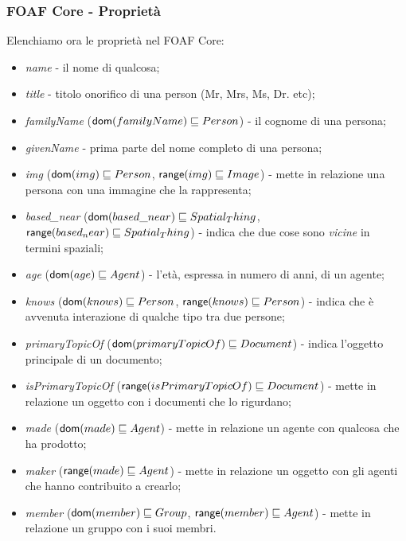 \documentclass[8pt]{beamer}
\begin{document}
\begin{frame}
  \frametitle{FOAF Core - Propriet\`a}
  Elenchiamo ora le propriet\`a nel FOAF Core:
  
  \begin{itemize}[<+->]
   \item \emph{name} - il nome di qualcosa;
   \item \emph{title} - titolo onorifico di una person (Mr, Mrs, Ms, Dr. etc);
   \item \emph{familyName} ($\mathsf{dom}(familyName) \sqsubseteq Person$) - il cognome di una persona;
   \item \emph{givenName} - prima parte del nome completo di una persona;
   \item \emph{img} ($\mathsf{dom}(img) \sqsubseteq Person$, $\mathsf{range}(img) \sqsubseteq Image$) - mette in relazione una persona con 
   una immagine che la rappresenta;
   \item \emph{based\_near} ($\mathsf{dom}(based\_near) \sqsubseteq Spatial_Thing$, $\mathsf{range}(based_near) \sqsubseteq Spatial_Thing$) - 
    indica che due cose sono \emph{vicine} in termini spaziali;
   \item \emph{age} ($\mathsf{dom}(age) \sqsubseteq Agent$) - l'et\`a, espressa in numero di anni, di un agente;    
   \item \emph{knows} ($\mathsf{dom}(knows) \sqsubseteq Person$, $\mathsf{range}(knows) \sqsubseteq Person$) - indica che \`e avvenuta interazione
   di qualche tipo tra due persone;
   \item \emph{primaryTopicOf} ($\mathsf{dom}(primaryTopicOf) \sqsubseteq Document$) - indica l'oggetto principale di un documento;
   \item \emph{isPrimaryTopicOf} ($\mathsf{range}(isPrimaryTopicOf) \sqsubseteq Document$) - mette in relazione un oggetto con i 
    documenti che lo rigurdano;
   \item \emph{made} ($\mathsf{dom}(made) \sqsubseteq Agent$) - mette in relazione un agente con qualcosa 
   che ha prodotto;
   \item \emph{maker} ($\mathsf{range}(made) \sqsubseteq Agent$) - mette in relazione un oggetto con gli agenti
   che hanno contribuito a crearlo; 
   \item \emph{member} ($\mathsf{dom}(member) \sqsubseteq Group$, $\mathsf{range}(member) \sqsubseteq Agent$) - mette in relazione un
   gruppo con i suoi membri.
  \end{itemize}
\end{frame}
\end{document}
